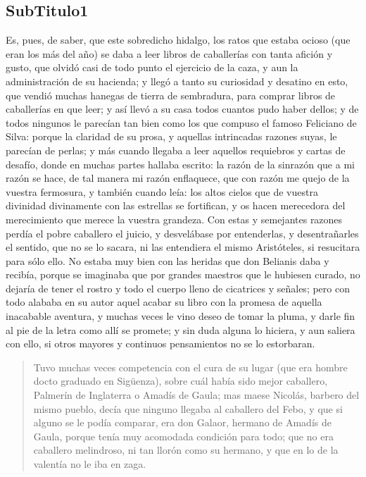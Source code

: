 \subsection{SubTitulo1}
Es, pues, de saber, que este sobredicho hidalgo, los ratos que estaba ocioso (que eran los más del año) se daba a leer libros de caballerías con tanta afición y gusto, que olvidó casi de todo punto el ejercicio de la caza, y aun la administración de su hacienda; y llegó a tanto su curiosidad y desatino en esto, que vendió muchas hanegas de tierra de sembradura, para comprar libros de caballerías en que leer; y así llevó a su casa todos cuantos pudo haber dellos; y de todos ningunos le parecían tan bien como los que compuso el famoso Feliciano de Silva: porque la claridad de su prosa, y aquellas intrincadas razones suyas, le parecían de perlas; y más cuando llegaba a leer aquellos requiebros y cartas de desafío, donde en muchas partes hallaba escrito: la razón de la sinrazón que a mi razón se hace, de tal manera mi razón enflaquece, que con razón me quejo de la vuestra fermosura, y también cuando leía: los altos cielos que de vuestra divinidad divinamente con las estrellas se fortifican, y os hacen merecedora del merecimiento que merece la vuestra grandeza. Con estas y semejantes razones perdía el pobre caballero el juicio, y desvelábase por entenderlas, y desentrañarles el sentido, que no se lo sacara, ni las entendiera el mismo Aristóteles, si resucitara para sólo ello. No estaba muy bien con las heridas que don Belianis daba y recibía, porque se imaginaba que por grandes maestros que le hubiesen curado, no dejaría de tener el rostro y todo el cuerpo lleno de cicatrices y señales; pero con todo alababa en su autor aquel acabar su libro con la promesa de aquella inacabable aventura, y muchas veces le vino deseo de tomar la pluma, y darle fin al pie de la letra como allí se promete; y sin duda alguna lo hiciera, y aun saliera con ello, si otros mayores y continuos pensamientos no se lo estorbaran.

\begin{quote}
Tuvo muchas veces competencia con el cura de su lugar (que era hombre docto graduado en Sigüenza), sobre cuál había sido mejor caballero, Palmerín de Inglaterra o Amadís de Gaula; mas maese Nicolás, barbero del mismo pueblo, decía que ninguno llegaba al caballero del Febo, y que si alguno se le podía comparar, era don Galaor, hermano de Amadís de Gaula, porque tenía muy acomodada condición para todo; que no era caballero melindroso, ni tan llorón como su hermano, y que en lo de la valentía no le iba en zaga.\cite{referencia}
\end{quote}

